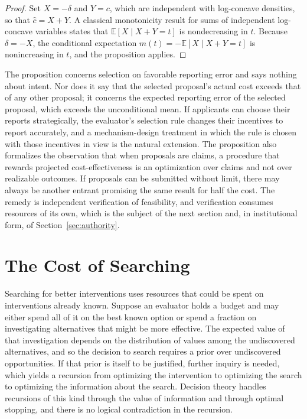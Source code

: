 \documentclass[11pt]{article}
\theoremstyle{definition}
\theoremstyle{remark}
\newcommand{\E}{\mathbb{E}}
\begin{document}
\begin{proof}
Set $X=-\delta$ and $Y=c$, which are independent with log-concave densities, so that $\hat c=X+Y$. A classical monotonicity result for sums of independent log-concave variables \citep{efron1965} states that $\E[X\mid X+Y=t]$ is nondecreasing in $t$. Because $\delta=-X$, the conditional expectation $m(t)=-\E[X\mid X+Y=t]$ is nonincreasing in $t$, and the proposition applies.
\end{proof}

The proposition concerns selection on favorable reporting error and says nothing about intent. Nor does it say that the selected proposal's actual cost exceeds that of any other proposal; it concerns the expected reporting error of the selected proposal, which exceeds the unconditional mean. If applicants can choose their reports strategically, the evaluator's selection rule changes their incentives to report accurately, and a mechanism-design treatment in which the rule is chosen with those incentives in view is the natural extension. The proposition also formalizes the observation that when proposals are claims, a procedure that rewards projected cost-effectiveness is an optimization over claims and not over realizable outcomes. If proposals can be submitted without limit, there may always be another entrant promising the same result for half the cost. The remedy is independent verification of feasibility, and verification consumes resources of its own, which is the subject of the next section and, in institutional form, of Section~\ref{sec:authority}.

\section{The Cost of Searching}
\label{sec:search}

Searching for better interventions uses resources that could be spent on interventions already known. Suppose an evaluator holds a budget and may either spend all of it on the best known option or spend a fraction on investigating alternatives that might be more effective. The expected value of that investigation depends on the distribution of values among the undiscovered alternatives, and so the decision to search requires a prior over undiscovered opportunities. If that prior is itself to be justified, further inquiry is needed, which yields a recursion from optimizing the intervention to optimizing the search to optimizing the information about the search. Decision theory handles recursions of this kind through the value of information \citep{howard1966} and through optimal stopping, and there is no logical contradiction in the recursion.
\end{document}
